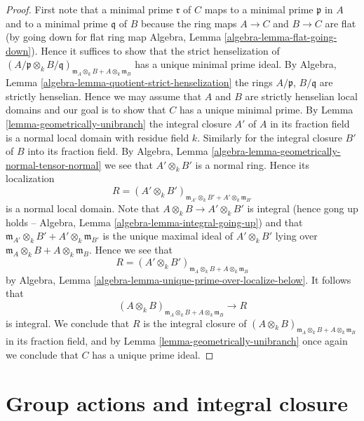 \begin{proof}
First note that a minimal prime $\mathfrak r$ of $C$ maps to a minimal
prime $\mathfrak p$ in $A$ and to a minimal prime $\mathfrak q$ of $B$
because the ring maps $A \to C$ and $B \to C$ are flat (by going down for
flat ring map Algebra, Lemma \ref{algebra-lemma-flat-going-down}).
Hence it suffices to show that the strict henselization of
$(A/\mathfrak p \otimes_k B/\mathfrak q)_{
\mathfrak m_A \otimes_k B + A \otimes_k \mathfrak m_B}$
has a unique minimal prime ideal. By
Algebra, Lemma \ref{algebra-lemma-quotient-strict-henselization}
the rings $A/\mathfrak p$, $B/\mathfrak q$ are strictly henselian.
Hence we may assume that $A$ and $B$ are strictly henselian
local domains and our goal is to show that $C$ has a unique minimal prime.
By Lemma \ref{lemma-geometrically-unibranch} the
integral closure $A'$ of $A$ in its fraction field
is a normal local domain with residue field $k$. Similarly for the
integral closure $B'$ of $B$ into its fraction field. By
Algebra, Lemma \ref{algebra-lemma-geometrically-normal-tensor-normal}
we see that $A' \otimes_k B'$ is a normal ring. Hence its localization
$$
R = (A' \otimes_k B')_{
\mathfrak m_{A'} \otimes_k B' + A' \otimes_k \mathfrak m_{B'}}
$$
is a normal local domain. Note that $A \otimes_k B \to A' \otimes_k B'$
is integral (hence gong up holds --
Algebra, Lemma \ref{algebra-lemma-integral-going-up})
and that $\mathfrak m_{A'} \otimes_k B' + A' \otimes_k \mathfrak m_{B'}$
is the unique maximal ideal of $A' \otimes_k B'$
lying over $\mathfrak m_A \otimes_k B + A \otimes_k \mathfrak m_B$.
Hence we see that
$$
R = (A' \otimes_k B')_{
\mathfrak m_A \otimes_k B + A \otimes_k \mathfrak m_B}
$$
by
Algebra, Lemma \ref{algebra-lemma-unique-prime-over-localize-below}.
It follows that
$$
(A \otimes_k B)_{
\mathfrak m_A \otimes_k B + A \otimes_k \mathfrak m_B}
\longrightarrow
R
$$
is integral. We conclude that $R$ is the integral closure of
$(A \otimes_k B)_{
\mathfrak m_A \otimes_k B + A \otimes_k \mathfrak m_B}$
in its fraction field, and by
Lemma \ref{lemma-geometrically-unibranch}
once again we conclude that $C$ has a unique prime ideal.
\end{proof}






\section{Group actions and integral closure}
\label{section-group-actions-integral}

